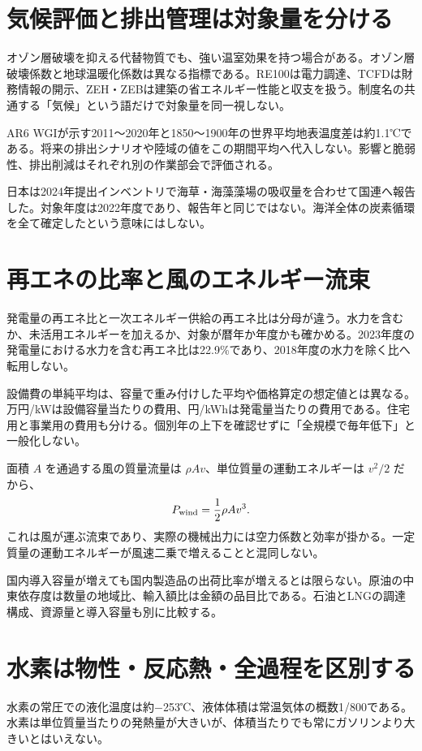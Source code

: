 \section{気候評価と排出管理は対象量を分ける}
\label{theory:env:climateaction}
\label{theory:env:ar6}
\label{theory:env:blue}
オゾン層破壊を抑える代替物質でも、強い温室効果を持つ場合がある。オゾン層破壊係数と地球温暖化係数は異なる指標である。RE100は電力調達、TCFDは財務情報の開示、ZEH・ZEBは建築の省エネルギー性能と収支を扱う。制度名の共通する「気候」という語だけで対象量を同一視しない。

AR6 WGIが示す2011〜2020年と1850〜1900年の世界平均地表温度差は約1.1℃である。将来の排出シナリオや陸域の値をこの期間平均へ代入しない。影響と脆弱性、排出削減はそれぞれ別の作業部会で評価される。\cite{env60_ar6}

日本は2024年提出インベントリで海草・海藻藻場の吸収量を合わせて国連へ報告した。対象年度は2022年度であり、報告年と同じではない。海洋全体の炭素循環を全て確定したという意味にはしない。\cite{env60_blue}

\section{再エネの比率と風のエネルギー流束}
\label{theory:env:renewables}
\label{theory:env:energy2020}
\label{theory:env:oil2019}
発電量の再エネ比と一次エネルギー供給の再エネ比は分母が違う。水力を含むか、未活用エネルギーを加えるか、対象が暦年か年度かも確かめる。2023年度の発電量における水力を含む再エネ比は22.9\%であり、2018年度の水力を除く比へ転用しない。\cite{env60_re2023}

設備費の単純平均は、容量で重み付けした平均や価格算定の想定値とは異なる。万円/kWは設備容量当たりの費用、円/kWhは発電量当たりの費用である。住宅用と事業用の費用も分ける。個別年の上下を確認せずに「全規模で毎年低下」と一般化しない。\cite{env60_pv2024}

面積 \(A\) を通過する風の質量流量は \(\rho Av\)、単位質量の運動エネルギーは \(v^2/2\) だから、
\[
 P_{\rm wind}=\frac12\rho Av^3.
\]
これは風が運ぶ流束であり、実際の機械出力には空力係数と効率が掛かる。一定質量の運動エネルギーが風速二乗で増えることと混同しない。

国内導入容量が増えても国内製造品の出荷比率が増えるとは限らない。原油の中東依存度は数量の地域比、輸入額比は金額の品目比である。石油とLNGの調達構成、資源量と導入容量も別に比較する。

\section{水素は物性・反応熱・全過程を区別する}
\label{theory:env:hydrogen}
水素の常圧での液化温度は約−253℃、液体体積は常温気体の概数1/800である。水素は単位質量当たりの発熱量が大きいが、体積当たりでも常にガソリンより大きいとはいえない。

